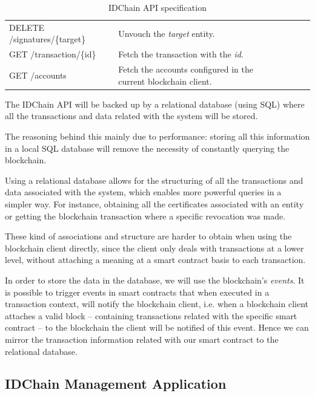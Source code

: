 {\begin{table}[h]
\begin{tabular}{|l|l|lll}
    DELETE /signatures/\{target\}   & Unvouch the \textit{target} entity.                      &  &  &  \\ \cline{1-2}

    GET /transaction/\{id\}         & Fetch the transaction with the \textit{id}.                      &  &  &  \\ \cline{1-2}

    GET /accounts                   & Fetch the accounts configured in the current blockchain client.                        &  &  & \\ \cline{1-2}
  \end{tabular}%
  \caption{IDChain API specification}
\label{table:idchain-api-spec}
\end{table}

The IDChain API will be backed up by a relational database (using \ac{SQL}) where all the transactions and data related with the system will be stored.

The reasoning behind this mainly due to performance: storing all this information in a local \ac{SQL} database will remove the necessity of constantly querying the blockchain.

Using a relational database allows for the structuring of all the transactions and data associated with the system, which enables more powerful queries in a simpler way. For instance, obtaining all the certificates associated with an entity or getting the blockchain transaction where a specific revocation was made.

These kind of associations and structure are harder to obtain when using the blockchain client directly, since the client only deals with transactions at a lower level, without attaching a meaning at a smart contract basis to each transaction.

In order to store the data in the database, we will use the blockchain's \textit{events}.
It is possible to trigger events in smart contracts that when executed in a transaction context, will notify the blockchain client, i.e. when a blockchain client attaches a valid block  – containing transactions related with the specific smart contract – to the blockchain the client will be notified of this event.
Hence we can mirror the transaction information related with our smart contract to the relational database.

\subsection{IDChain Management Application}
\label{subsection:idchain-app}

}
